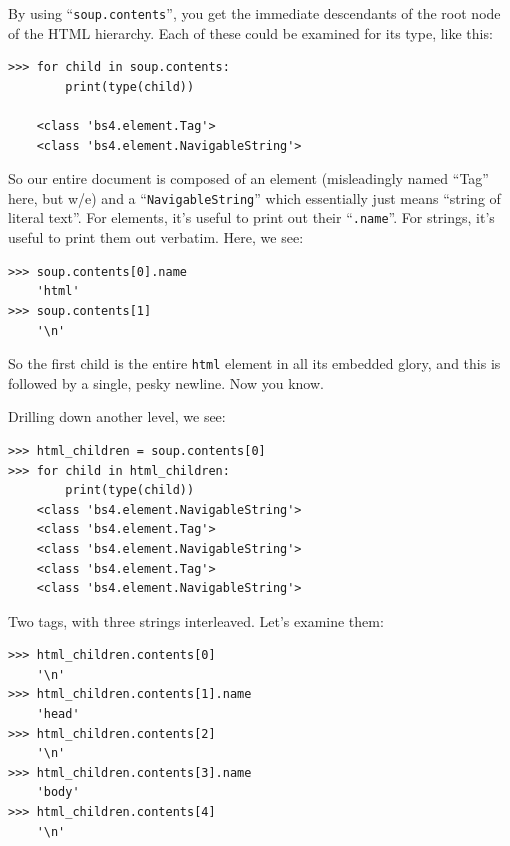 By using ``\texttt{soup.contents}'', you get the immediate descendants of
the root node of the HTML hierarchy. Each of these could be examined for its
type, like this:

\vspace{-.1in}
\begin{Verbatim}[fontsize=\footnotesize,samepage=true,frame=single]
>>> for child in soup.contents:
        print(type(child))

    <class 'bs4.element.Tag'>
    <class 'bs4.element.NavigableString'>
\end{Verbatim}

So our entire document is composed of an element (misleadingly named ``Tag''
here, but w/e) and a ``\texttt{NavigableString}'' which essentially just means
``string of literal text''. For elements, it's useful to print out their
``\texttt{.name}''. For strings, it's useful to print them out verbatim. Here,
we see:

\vspace{-.1in}
\begin{Verbatim}[fontsize=\footnotesize,samepage=true,frame=single]
>>> soup.contents[0].name
    'html'
>>> soup.contents[1]
    '\n'
\end{Verbatim}

So the first child is the entire \texttt{html} element in all its embedded
glory, and this is followed by a single, pesky newline. Now you know.

Drilling down another level, we see:

\vspace{-.1in}
\begin{Verbatim}[fontsize=\footnotesize,samepage=true,frame=single]
>>> html_children = soup.contents[0]
>>> for child in html_children:
        print(type(child))
    <class 'bs4.element.NavigableString'>
    <class 'bs4.element.Tag'>
    <class 'bs4.element.NavigableString'>
    <class 'bs4.element.Tag'>
    <class 'bs4.element.NavigableString'>
\end{Verbatim}

Two tags, with three strings interleaved. Let's examine them:

\vspace{-.1in}
\begin{Verbatim}[fontsize=\footnotesize,samepage=true,frame=single]
>>> html_children.contents[0]
    '\n'
>>> html_children.contents[1].name
    'head'
>>> html_children.contents[2]
    '\n'
>>> html_children.contents[3].name
    'body'
>>> html_children.contents[4]
    '\n'
\end{Verbatim}

